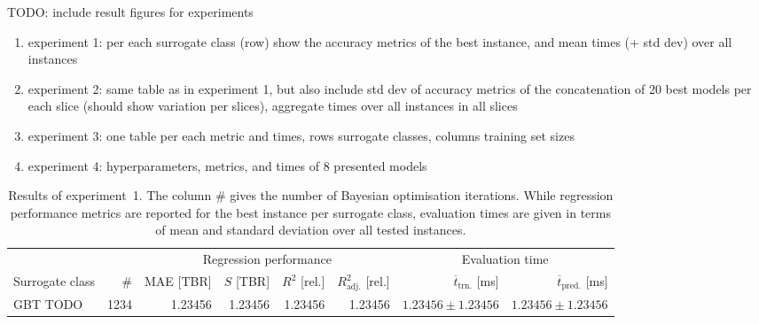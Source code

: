 TODO: include result figures for experiments

\begin{enumerate}
	\item experiment 1: per each surrogate class (row)
		show the accuracy metrics of the best instance, and mean times (+ std
		dev) over all instances
	\item experiment 2: same table as in experiment 1, but also include std dev
		of accuracy metrics of the concatenation of 20 best models per each
		slice (should show variation per slices), aggregate times over all
		instances in all slices
	\item experiment 3: one table per each metric and times, rows surrogate
		classes, columns training set sizes
	\item experiment 4: hyperparameters, metrics, and times of 8 presented models
\end{enumerate}

\begin{table}[h]
	\centering
	{\footnotesize
		\begin{tabular}{lrrrrrrr}
		\toprule
		{} & {} & \multicolumn{4}{c}{Regression performance} &
		\multicolumn{2}{c}{Evaluation time}\\
		\cmidrule(lr){3-6}
		\cmidrule(lr){7-8}
		Surrogate class & \# & MAE [TBR] & $S$ [TBR] & $R^2$ [rel.] & $R^2_{\text{adj.}}$ [rel.]
						& $\overline{t}_{\text{trn.}}$ [ms] &
						$\overline{t}_{\text{pred.}}$ [ms]\\
		\midrule
		GBT TODO
						& \num{1234}
						& \num{1.23456}
						& \num{1.23456}
						& \num{1.23456}
						& \num{1.23456}
						& $\num{1.23456} \pm \num{1.23456}$
						& $\num{1.23456} \pm \num{1.23456}$
		\\
		\bottomrule
		\end{tabular}
	}
	\caption{Results of experiment~1. The column \# gives the number of
		Bayesian optimisation iterations.
		While regression performance metrics are reported for the best instance
		per surrogate class, evaluation times are given in terms of mean and standard deviation over all tested instances.}
	\label{tbl:exp1-detailed-results}
\end{table}

